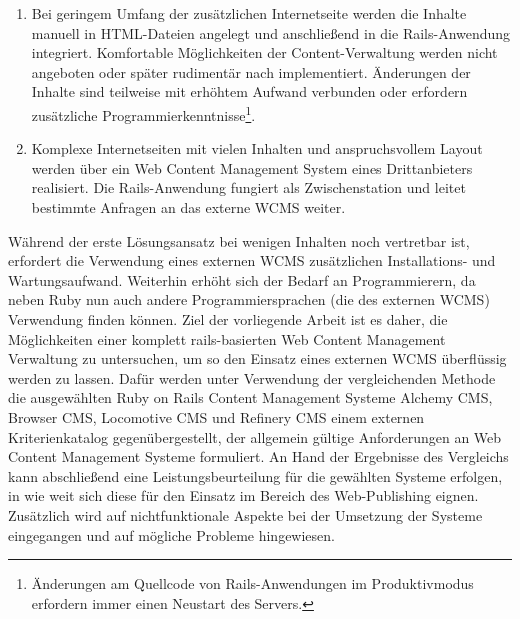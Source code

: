 \begin{enumerate}
\item{
Bei geringem Umfang der zusätzlichen Internetseite werden die Inhalte manuell in HTML-Dateien angelegt und anschließend in die Rails-Anwendung integriert. Komfortable Möglichkeiten der Content-Verwaltung werden nicht angeboten oder später rudimentär nach implementiert. Änderungen der Inhalte sind teilweise mit erhöhtem Aufwand verbunden oder erfordern zusätzliche Programmierkenntnisse\footnote{Änderungen am Quellcode von Rails-Anwendungen im Produktivmodus erfordern immer einen Neustart des Servers.}.
}

\item{
Komplexe Internetseiten mit vielen Inhalten und anspruchsvollem Layout werden über ein Web Content Management System eines Drittanbieters realisiert. Die Rails-Anwendung fungiert als Zwischenstation und leitet bestimmte Anfragen an das externe WCMS weiter.
}
\end{enumerate}Während der erste Lösungsansatz bei wenigen Inhalten noch vertretbar ist, erfordert die Verwendung eines externen WCMS zusätzlichen Installations- und Wartungsaufwand. Weiterhin erhöht sich der Bedarf an Programmierern, da neben Ruby nun auch andere Programmiersprachen (die des externen WCMS) Verwendung finden können.
\newline
\newline
Ziel der vorliegende Arbeit ist es daher, die Möglichkeiten einer komplett rails-basierten Web Content Management Verwaltung zu untersuchen, um so den Einsatz eines externen WCMS überflüssig werden zu lassen.
\newline
\newline
Dafür werden unter Verwendung der vergleichenden Methode die ausgewählten Ruby on Rails Content Management Systeme Alchemy CMS, Browser CMS, Locomotive CMS und Refinery CMS einem externen Kriterienkatalog gegenübergestellt, der allgemein gültige Anforderungen an Web Content Management Systeme formuliert. An Hand der Ergebnisse des Vergleichs kann abschließend eine Leistungsbeurteilung für die gewählten Systeme erfolgen, in wie weit sich diese für den Einsatz im Bereich des Web-Publishing eignen.
Zusätzlich wird auf nichtfunktionale Aspekte bei der Umsetzung der Systeme eingegangen und auf mögliche Probleme hingewiesen.

